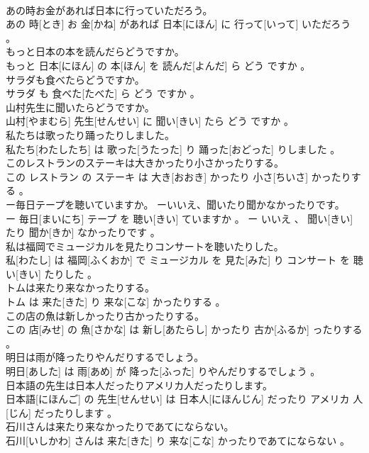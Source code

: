 \documentclass[8pt]{extreport}
\begin{document}
\begin{CJK}{UTF8}{min}
\\	あの時お金があれば日本に行っていただろう。	
\\	あの 時[とき] お 金[かね] があれば 日本[にほん] に 行って[いって] いただろう 。
\\	もっと日本の本を読んだらどうですか。	
\\	もっと 日本[にほん] の 本[ほん] を 読んだ[よんだ] ら どう ですか 。
\\	サラダも食べたらどうですか。	
\\	サラダ も 食べた[たべた] ら どう ですか 。
\\	山村先生に聞いたらどうですか。	
\\	山村[やまむら] 先生[せんせい] に 聞い[きい] たら どう ですか 。
\\	私たちは歌ったり踊ったりしました。	
\\	私たち[わたしたち] は 歌った[うたった] り 踊った[おどった] りしました 。
\\	このレストランのステーキは大きかったり小さかったりする。	
\\	この レストラン の ステーキ は 大き[おおき] かったり 小さ[ちいさ] かったりする 。
\\	ー毎日テープを聴いていますか。 ーいいえ、聞いたり聞かなかったりです。	
\\	ー 毎日[まいにち] テープ を 聴い[きい] ていますか 。 ー いいえ 、 聞い[きい] たり 聞か[きか] なかったりです 。
\\	私は福岡でミュージカルを見たりコンサートを聴いたりした。	
\\	私[わたし] は 福岡[ふくおか] で ミュージカル を 見た[みた] り コンサート を 聴い[きい] たりした 。
\\	トムは来たり来なかったりする。	
\\	トム は 来た[きた] り 来な[こな] かったりする 。
\\	この店の魚は新しかったり古かったりする。	
\\	この 店[みせ] の 魚[さかな] は 新し[あたらし] かったり 古か[ふるか] ったりする 。
\\	明日は雨が降ったりやんだりするでしょう。	
\\	明日[あした] は 雨[あめ] が 降った[ふった] りやんだりするでしょう 。
\\	日本語の先生は日本人だったりアメリカ人だったりします。	
\\	日本語[にほんご] の 先生[せんせい] は 日本人[にほんじん] だったり アメリカ 人[じん] だったりします 。
\\	石川さんは来たり来なかったりであてにならない。	
\\	石川[いしかわ] さんは 来た[きた] り 来な[こな] かったりであてにならない 。

\end{CJK}
\end{document}
